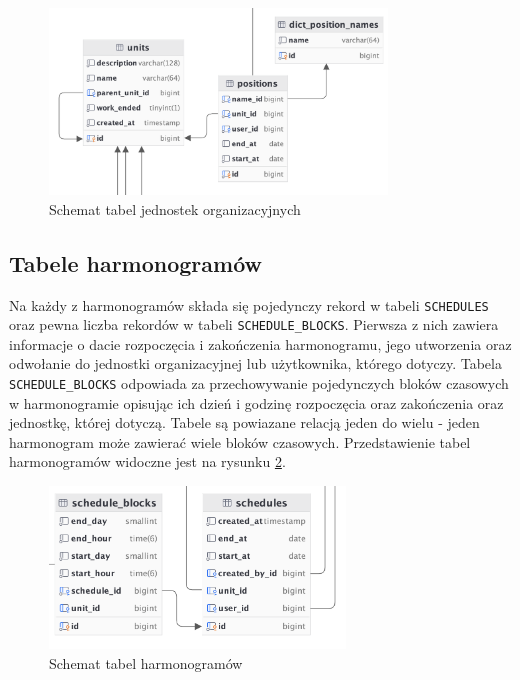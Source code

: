 \begin{figure}[H]
    \centering
    \includegraphics[width=0.8\textwidth]{graf/unitsTable.png}
    \caption{Schemat tabel jednostek organizacyjnych}
    \label{fig:organizationalUnitsTable}
\end{figure}

\subsection{Tabele harmonogramów}



Na każdy z harmonogramów składa się pojedynczy rekord w tabeli \texttt{SCHEDULES} oraz pewna liczba rekordów w tabeli \texttt{SCHEDULE\_BLOCKS}. Pierwsza z nich zawiera informacje o dacie rozpoczęcia i zakończenia harmonogramu, jego utworzenia oraz odwołanie do jednostki organizacyjnej lub użytkownika, którego dotyczy. Tabela \texttt{SCHEDULE\_BLOCKS} odpowiada za przechowywanie pojedynczych bloków czasowych w harmonogramie opisując ich dzień i godzinę rozpoczęcia oraz zakończenia oraz jednostkę, której dotyczą. Tabele są powiazane relacją jeden do wielu - jeden harmonogram może zawierać wiele bloków czasowych. Przedstawienie tabel harmonogramów widoczne jest na rysunku \ref{fig:schedulesTable}.

\begin{figure}[H]
    \centering
    \includegraphics[width=0.7\textwidth]{graf/scheduleTable.png}
    \caption{Schemat tabel harmonogramów}
    \label{fig:schedulesTable}
\end{figure}

